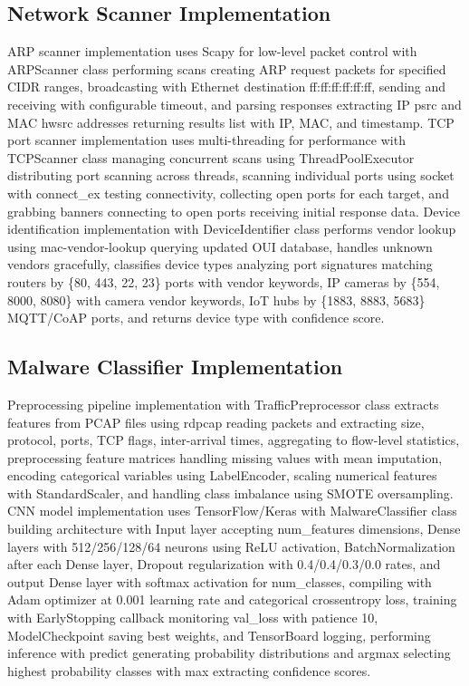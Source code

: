 \subsection{Network Scanner Implementation}

ARP scanner implementation uses Scapy for low-level packet control with ARPScanner class performing scans creating ARP request packets for specified CIDR ranges, broadcasting with Ethernet destination ff:ff:ff:ff:ff:ff, sending and receiving with configurable timeout, and parsing responses extracting IP psrc and MAC hwsrc addresses returning results list with IP, MAC, and timestamp. TCP port scanner implementation uses multi-threading for performance with TCPScanner class managing concurrent scans using ThreadPoolExecutor distributing port scanning across threads, scanning individual ports using socket with connect\_ex testing connectivity, collecting open ports for each target, and grabbing banners connecting to open ports receiving initial response data. Device identification implementation with DeviceIdentifier class performs vendor lookup using mac-vendor-lookup querying updated OUI database, handles unknown vendors gracefully, classifies device types analyzing port signatures matching routers by \{80, 443, 22, 23\} ports with vendor keywords, IP cameras by \{554, 8000, 8080\} with camera vendor keywords, IoT hubs by \{1883, 8883, 5683\} MQTT/CoAP ports, and returns device type with confidence score.

\subsection{Malware Classifier Implementation}

Preprocessing pipeline implementation with TrafficPreprocessor class extracts features from PCAP files using rdpcap reading packets and extracting size, protocol, ports, TCP flags, inter-arrival times, aggregating to flow-level statistics, preprocessing feature matrices handling missing values with mean imputation, encoding categorical variables using LabelEncoder, scaling numerical features with StandardScaler, and handling class imbalance using SMOTE oversampling. CNN model implementation uses TensorFlow/Keras with MalwareClassifier class building architecture with Input layer accepting num\_features dimensions, Dense layers with 512/256/128/64 neurons using ReLU activation, BatchNormalization after each Dense layer, Dropout regularization with 0.4/0.4/0.3/0.0 rates, and output Dense layer with softmax activation for num\_classes, compiling with Adam optimizer at 0.001 learning rate and categorical crossentropy loss, training with EarlyStopping callback monitoring val\_loss with patience 10, ModelCheckpoint saving best weights, and TensorBoard logging, performing inference with predict generating probability distributions and argmax selecting highest probability classes with max extracting confidence scores.

